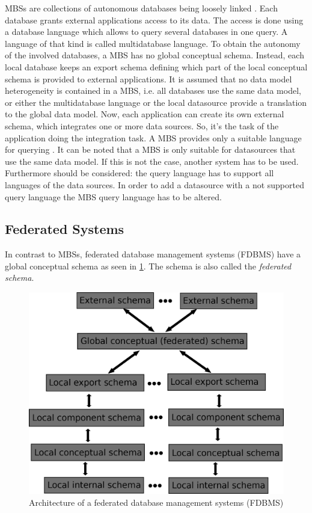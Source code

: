 MBSs are collections of autonomous databases being loosely linked \cite[p. 93]{DBLP:books/dp/LeserN2006}. Each database grants external applications access to its data. The access is done using a database language which allows to query several databases in one query. 
A language of that kind is called multidatabase language. To obtain the autonomy  of the involved databases, a MBS has no global conceptual schema. Instead, each local database keeps an export schema defining which part of the local conceptual schema is provided to external applications.  
It is assumed that no data model heterogeneity is contained in a MBS, i.e. all databases use the same data model, or either the multidatabase language or the local datasource provide a translation to the global data model. Now, each application can create its own external schema, which integrates one or more data sources. So, it's the task of the application doing the integration task. A MBS provides only a suitable language for querying \cite[p. 94]{DBLP:books/dp/LeserN2006}.	
It can be noted that a MBS is only suitable for datasources that use the same data model. If this is not the case, another system has to be used. Furthermore should be considered: the query language has to support all languages of the data sources. In order to add a datasource with a not supported query language the MBS query language has to be altered. 

\subsection{Federated Systems}

In contrast to MBSs, federated database management systems (FDBMS) have a global conceptual schema as seen in \ref{FDBMSArchitecture}. The schema is also called the \emph{federated schema}.

\begin{figure}[H]
	\begin{center}
		\includegraphics[scale=0.5]{figures/federatedDatabaseArchitecture.png}
	\end{center}
	\caption{Architecture of a  federated database management systems (FDBMS) \cite[p. 95]{DBLP:books/dp/LeserN2006}}
	\label{FDBMSArchitecture}
\end{figure}

